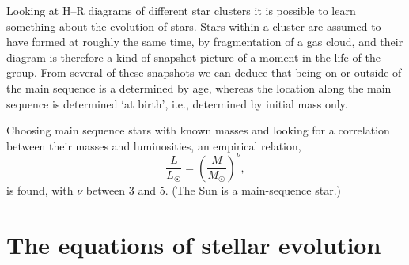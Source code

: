 \documentclass[]{article}
\newcommand{\Sun}{\astrosun}
\begin{document}
Looking at H--R diagrams of different star clusters it is possible to learn
something about the evolution of stars. Stars within a cluster are assumed to
have formed at roughly the same time, by fragmentation of a gas cloud, and their
diagram is therefore a kind of snapshot picture of a moment in the life of the
group. From several of these snapshots we can deduce that being on or outside
of the main sequence is a determined by age, whereas the location along the main
sequence is determined `at birth', i.e., determined by initial mass only.

Choosing main sequence stars with known masses and looking for a correlation
between their masses and luminosities, an empirical relation,
\begin{equation}
\frac{L}{L_{\Sun}}=\left(\frac{M}{M_{\Sun}}\right)^\nu,
\end{equation}
is found, with $\nu$ between 3 and 5. (The Sun is a main-sequence star.)

\section{The equations of stellar evolution}
\end{document}
